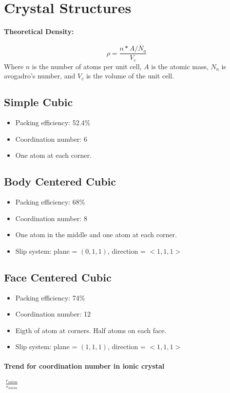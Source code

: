 \documentclass[a4paper,12pt]{report}
\begin{document}
\section{Crystal Structures}
\paragraph{Theoretical Density: } $$\rho = \frac{n*A/N_a}{V_c}$$ Where $n$ is the number of atoms per unit cell, $A$ is the atomic mass, $N_a$ is avogadro's number, and $V_c$ is the volume of the unit cell.
\subsection{Simple Cubic}
\begin{itemize}
\item Packing efficiency: 52.4\%
\item Coordination number: 6
\item One atom at each corner.
\end{itemize}

\subsection{Body Centered Cubic}
\begin{itemize}
\item Packing efficiency: 68\%
\item Coordination number: 8
\item One atom in the middle and one atom at each corner.
\item Slip system: plane = $(0, 1, 1)$, direction = $<1, 1, 1>$
\end{itemize}

\subsection{Face Centered Cubic}
\begin{itemize}
\item Packing efficiency: 74\%
\item Coordination number: 12
\item Eigth of atom at corners. Half atoms on each face.
\item Slip system: plane = $(1, 1, 1)$, direction = $<1, 1, 1>$
\end{itemize}

\paragraph{Trend for coordination number in ionic crystal} $~\frac{r_{cation}}{r_{anion}}$
\end{document}
